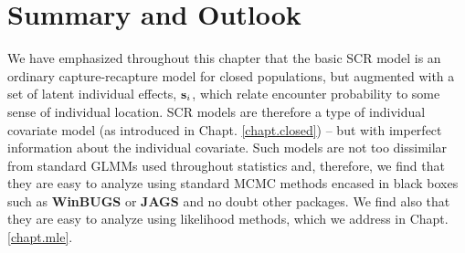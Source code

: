 {



\section{ Summary and Outlook }

We have emphasized throughout this chapter that the basic SCR
model is an ordinary capture-recapture model for
closed populations, but augmented with a set
of latent individual effects, ${\bf s}_{i}$, which relate encounter
probability to some sense of individual location. SCR models are
therefore a type of individual covariate model (as introduced in
Chapt. \ref{chapt.closed}) -- but with imperfect information about the
individual covariate.
Such models are not too dissimilar from standard GLMMs used throughout
statistics and, therefore, we
find that they are  easy to analyze using standard MCMC
methods encased in black boxes such as {\bf WinBUGS} or {\bf JAGS} and
no doubt other packages. We find also that they are easy to analyze using
likelihood methods, which we address in Chapt. \ref{chapt.mle}.

}
